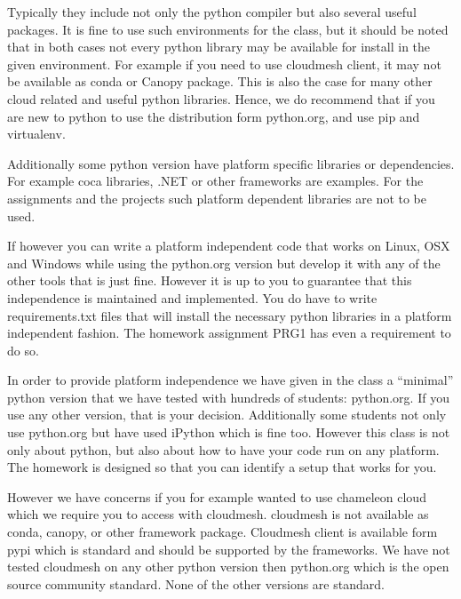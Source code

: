 Typically they include not only the python compiler but also several
useful packages. It is fine to use such environments for the class, but
it should be noted that in both cases not every python library may be
available for install in the given environment. For example if you need
to use cloudmesh client, it may not be available as conda or Canopy
package. This is also the case for many other cloud related and useful
python libraries. Hence, we do recommend that if you are new to python
to use the distribution form python.org, and use pip and virtualenv.

Additionally some python version have platform specific libraries or
dependencies. For example coca libraries, .NET or other frameworks are
examples. For the assignments and the projects such platform dependent
libraries are not to be used.

If however you can write a platform independent code that works on
Linux, OSX and Windows while using the python.org version but develop it
with any of the other tools that is just fine. However it is up to you
to guarantee that this independence is maintained and implemented. You
do have to write requirements.txt files that will install the necessary
python libraries in a platform independent fashion. The homework
assignment PRG1 has even a requirement to do so.

In order to provide platform independence we have given in the class a
``minimal'' python version that we have tested with hundreds of
students: python.org. If you use any other version, that is your
decision. Additionally some students not only use python.org but have
used iPython which is fine too. However this class is not only about
python, but also about how to have your code run on any platform. The
homework is designed so that you can identify a setup that works for
you.

However we have concerns if you for example wanted to use chameleon
cloud which we require you to access with cloudmesh. cloudmesh is not
available as conda, canopy, or other framework package. Cloudmesh client
is available form pypi which is standard and should be supported by the
frameworks. We have not tested cloudmesh on any other python version
then python.org which is the open source community standard. None of the
other versions are standard.

